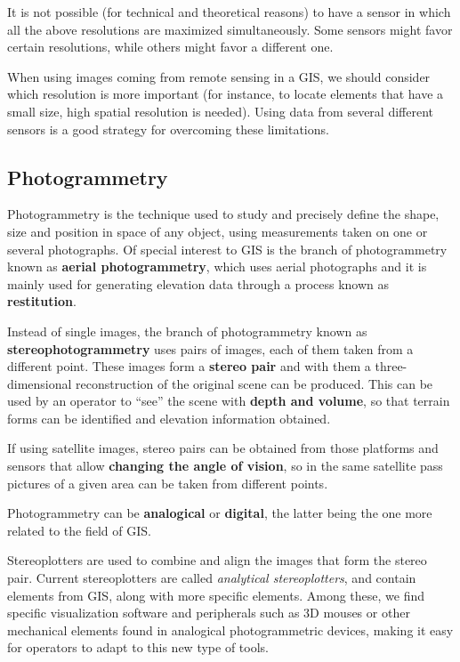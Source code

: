 It is not possible (for technical and theoretical reasons) to have a sensor in which all the above resolutions are maximized simultaneously. Some sensors might favor certain resolutions, while others might favor a different one.

When using images coming from remote sensing in a GIS, we should consider which resolution is more important (for instance, to locate elements that have a small size, high spatial resolution is needed). Using data from several different sensors is a good strategy for overcoming these limitations.


\subsection{Photogrammetry}

Photogrammetry is the technique used to study and precisely define the shape, size and position in space of any object, using measurements taken on one or several photographs. Of special interest to GIS is the branch of photogrammetry known as \textbf{aerial photogrammetry}, which uses aerial photographs and it is mainly used for generating elevation data through a process known as \textbf{restitution}.

Instead of single images, the branch of photogrammetry known as \textbf{stereophotogrammetry} uses pairs of images, each of them taken from a different point. These images form a \textbf{stereo pair} and with them a three-dimensional reconstruction of the original scene can be produced. This can be used by an operator to ``see'' the scene with \textbf{depth and volume}, so that terrain forms can be identified and elevation information obtained. 

If using satellite images, stereo pairs can be obtained from those platforms and sensors that allow \textbf{changing the angle of vision}, so in the same satellite pass pictures of a given area can be taken from different points.

Photogrammetry can be \textbf{analogical} or \textbf{digital}, the latter being the one more related to the field of GIS.

Stereoplotters are used to combine and align the images that form the stereo pair. Current stereoplotters are called \emph{analytical stereoplotters}, and contain elements from GIS, along with more specific elements. Among these, we find specific visualization software and peripherals such as 3D mouses or other mechanical elements found in analogical photogrammetric devices, making it easy for operators to adapt to this new type of tools.

